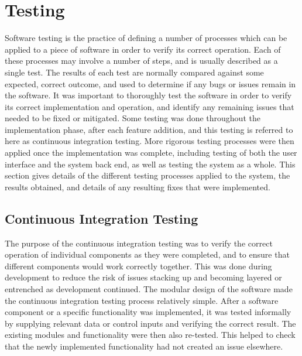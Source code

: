 
\chapter[Testing]{Testing} %

\label{Chapter10} %


Software testing is the practice of defining a number of processes which can be applied to a piece of software in order to verify its correct operation. Each of these processes may involve a number of steps, and is usually described as a single test. The results of each test are normally compared against some expected, correct outcome, and used to determine if any bugs or issues remain in the software. It was important to thoroughly test the software in order to verify its correct implementation and operation, and identify any remaining issues that needed to be fixed or mitigated. Some testing was done throughout the implementation phase, after each feature addition, and this testing is referred to here as continuous integration testing. More rigorous testing processes were then applied once the implementation was complete, including testing of both the user interface and the system back end, as well as testing the system as a whole. This section gives details of the different testing processes applied to the system, the results obtained, and details of any resulting fixes that were implemented.


\section{Continuous Integration Testing} \label{ContinuousIntegrationTesting}
The purpose of the continuous integration testing was to verify the correct operation of individual components as they were completed, and to ensure that different components would work correctly together. This was done during development to reduce the risk of issues stacking up and becoming layered or entrenched as development continued. The modular design of the software made the continuous integration testing process relatively simple. After a software component or a specific functionality was implemented, it was tested informally by supplying relevant data or control inputs and verifying the correct result. The existing modules and functionality were then also re-tested. This helped to check that the newly implemented functionality had not created an issue elsewhere. 

